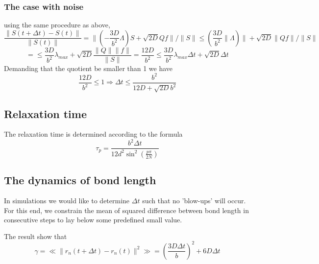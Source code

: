 \documentclass{report}
\begin{document}
 \subsubsection{The case with noise}
 using the same procedure as above, 
 \begin{equation*}
\frac{\|S(t+\Delta t)-S(t)\|}{\|S(t)\|}=\|(-\frac{3D}{b^2}\Lambda)S+\sqrt{2D}Qf\|/\|S\|\leq(\frac{3D}{b^2}\|\Lambda)\| +\sqrt{2D}\|Qf\|/\|S\|
 \end{equation*}
 \begin{equation*}
 =\leq \frac{3D}{b^2}\lambda_{max} +\sqrt{2D}\frac{\|Q\|\|f\|}{\|S\|}=\frac{12D}{b^2}\leq\frac{3D}{b^2}\lambda_{max}\Delta t +\sqrt{2D}\Delta t
 \end{equation*}
Demanding that the quotient be smaller than 1 we have 
\begin{equation*}
 \frac{12D}{b^2}\leq1 \Longrightarrow \Delta t \leq \frac{b^2}{12D+\sqrt{2D}b^2}
 \end{equation*}
\subsection{Relaxation time}
The relaxation time is determined according to the formula
\begin{equation}
\tau_p = \frac{b^2\Delta t}{12d^2\sin^2(\frac{p\pi}{2N})}
\end{equation} 

\subsection{The dynamics of bond length}\label{subsection_theDynamicsOfBondLength}
In simulations we would like to determine $\Delta t$ such that no 'blow-ups' will occur. For this end, we constrain the mean of squared difference between bond length in consecutive steps to lay below some predefined small value. 

The result show that 
\begin{equation*}
\gamma=\ll\|r_n(t+\Delta t)-r_n(t) \|^2\gg = \left(\frac{3D\Delta t}{b} \right)^2+6D\Delta t
\end{equation*}


\end{document}
